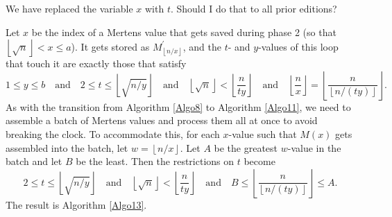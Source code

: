 \documentclass[12pt]{article}
\newcommand{\eqn}[1]{\begin{displaymath} #1 \end{displaymath}}
\newcommand{\neqn}[1]{\begin{equation} #1 \end{equation}}
\newcommand{\floor}[1]{{\left\lfloor #1 \right\rfloor}}
\newcommand{\quadtext}[1]{\quad \text{#1} \quad}
\newcommand{\floordiv}[2]{\floor{\frac{#1}{#2}}}
\newcommand{\isqrt}[1]{\floor{\sqrt{#1}}}
\begin{document}
We have replaced the variable $x$ with $t$.  \todo Should I do that to all prior editions?

Let $x$ be the index of a Mertens value that gets saved during phase 2 (so that $\isqrt{n} < x \leq a$).  It gets stored as $M^\prime_\floor{n/x}$, and the $t$- and $y$-values of this loop that touch it are exactly those that satisfy
\eqn{1 \leq y \leq b \quadtext{and} 2 \leq t \leq \isqrt{n/y} \quadtext{and} \isqrt{n} < \floordiv{n}{ty} \quadtext{and} \floordiv{n}{x} = \floordiv{n}{\floor{n/(ty)}}.}
As with the transition from Algorithm \ref{Algo8} to Algorithm \ref{Algo11}, we need to assemble a batch of Mertens values and process them all at once to avoid breaking the clock.  To accommodate this, for each $x$-value such that $M(x)$ gets assembled into the batch, let $w=\floor{n/x}$.  Let $A$ be the greatest $w$-value in the batch and let $B$ be the least.  Then the restrictions on $t$ become
\neqn{2 \leq t \leq \isqrt{n/y} \quadtext{and} \isqrt{n} < \floordiv{n}{ty} \quadtext{and} B \leq \floordiv{n}{\floor{n/(ty)}} \leq A. \label{cbafnlj}}
The result is Algorithm \ref{Algo13}.
\end{document}
